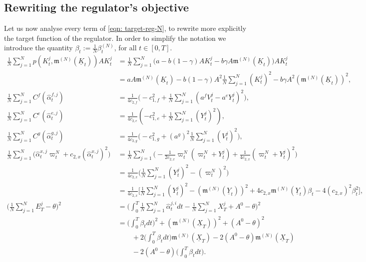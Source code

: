 \documentclass[10pt,a4paper]{amsart}
\numberwithin{equation}{section}
\newcommand{\w}{\varpi}
\renewcommand{\hat}{\widehat}
\newcommand{\avg}{\frac{1}{N}\sum_{j = 1}^N}
\begin{document}
\subsection{Rewriting the regulator's objective}\label{subsect_model_N:regulator_rewritten}

Let us now analyse every term of \eqref{eqn: target-reg-N}, to rewrite more explicitly the target function of the regulator. 
In order to simplify the notation we introduce the quantity $\beta_t:=\frac{1}{N}\beta^{(N)}_t$, for all $t \in [0,T]$.
\begin{align*}
    \frac{1}{N}\sum_{j = 1}^N p(K^j_t, \mathfrak{m}^{(N)}(\underline{K}_t)) AK^j_t & = \frac{1}{N}\sum_{j = 1}^N\bigg(a- b(1-\gamma) AK^j_t - b\gamma A\mathfrak{m}^{(N)}(\underline{K}_t)\bigg) AK^j_t\\
    & = aA\mathfrak{m}^{(N)}(\underline{K}_t) - b(1-\gamma) A^2\frac{1}{N} \sum_{j = 1}^N (K^j_t)^2 - b\gamma  A^2(\mathfrak{m}^{(N)}(\underline{K}_t))^2,\\
    \frac{1}{N}\sum_{j = 1}^NC^f(\hat\alpha^{f,j}_t) 
    & =\frac{1}{4 c_{2, f}}\bigg(-c_{1,f}^2 + \avg(a^f{V}^j_t-a^e{Y}^j_t)^2\bigg),\\
    \frac{1}{N}\sum_{j = 1}^NC^e(\hat\alpha^{e,j}_t)
    &= \frac{1}{4 c_{2, e}}(-c_{1,e}^2 + \frac{1}{N}\sum_{j=1}^N(Y^j_t)^2),\\
    \avg C^g(\hat\alpha^{g,j}_t) 
    &= \frac{1}{4 c_{2, g}}\bigg(-c_{1,g}^2 + (a^g)^2\frac{1}{N}\sum_{j = 1}^N (V^j_t)^2\bigg),\\
    \avg \big( \hat \alpha^{x,j}_t \w^N_t + c_{2,x} (\hat\alpha^{x,j}_t)^2)&= \avg \Bigg( - \frac{1}{2c_{2,x}} \w^N_t(\w^N_t + Y^j_t) + \frac{1}{4c_{2,x}} (\w^N_t + Y^j_t)^2\Bigg)\\
    &= \frac{1}{4c_{2,x}}\Bigg(\avg(Y^j_t)^2  - (\w^N_t)^2\Bigg) \\
    & = \frac{1}{4c_{2,x}}\Bigg[ \avg(Y^j_t)^2 - (\mathfrak{m}^{(N)}(\underline{Y}_t))^2 + 4c_{2,x} \mathfrak{m}^{(N)}(\underline{Y}_t)\beta_t - 4(c_{2,x})^2 \beta^2_t\Bigg],\\
    \bigg(\avg E^j_T - \theta\bigg)^2 
    & = \bigg(\int_0^T \avg \hat{\alpha}^{j,i}_t dt - \avg X^j_T + A^0-\theta\bigg)^2\\
    & = \bigg (\int_0^T \beta_tdt\bigg)^2 + ( \mathfrak{m}^{(N)}(\underline{X}_T))^2 + (A^0 - \theta)^2 \\
    &\qquad + 2\bigg(\int_0^T \beta_tdt\bigg)\mathfrak{m}^{(N)}(\underline{X}_T) - 2(A^0 - \theta) \mathfrak{m}^{(N)}(\underline{X}_T)\\
    &\qquad- 2(A^0-\theta) \bigg(\int_0^T\beta_t dt\bigg).
\end{align*}
\end{document}
